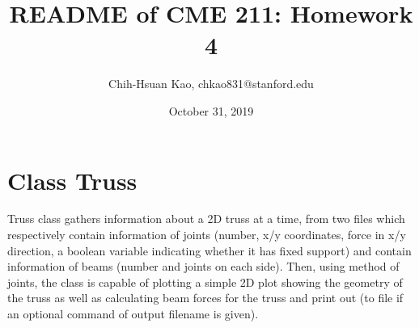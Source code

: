 \documentclass{article}
\title{README of CME 211: Homework 4}
\author{Chih-Hsuan Kao, chkao831@stanford.edu}
\date{October 31, 2019}
\begin{document}
\maketitle
\section{Class Truss}
Truss class gathers information about a 2D truss at a time, from two files which respectively contain information of joints (number, x/y coordinates, force in x/y direction, a boolean variable indicating whether it has fixed support) and contain information of beams (number and joints on each side). 
Then, using method of joints, the class is capable of plotting a simple 2D plot showing the geometry of the truss as well as calculating beam forces for the truss and print out (to file if an optional command of output filename is given).
\end{document}
